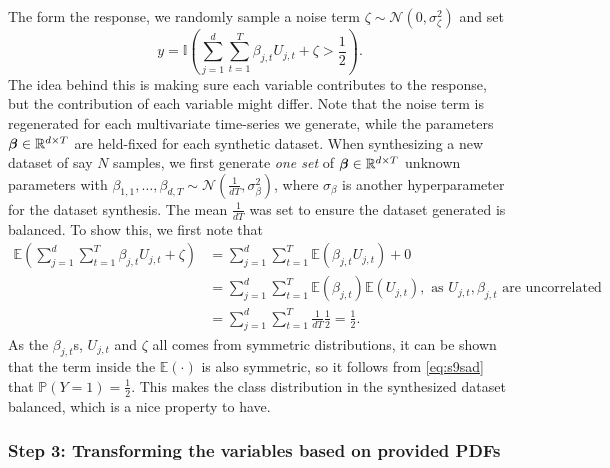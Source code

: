 \documentclass{statsmsc}
\begin{document}
{The form the response, we randomly sample a noise term $\zeta \sim \mathcal{N}(0,\sigma_\zeta^2)$
and set
\begin{equation}
    y=\mathbb{I}\left(\sum^{d}_{j=1} \sum^{T}_{t=1} \beta_{j,t} U_{j,t}+\zeta > \frac{1}{2}  \right).
\end{equation}
The idea behind this is making sure each variable contributes to the response, but the contribution
of each variable might differ.
Note that the noise term is regenerated for each multivariate time-series we generate, while the
parameters $\bm\beta \in \mathbb{R}^{d \times T}$ are held-fixed for each synthetic dataset.
When synthesizing a new dataset of say $N$ samples, we first generate \textit{one set} of
$\bm\beta \in \mathbb{R}^{d \times T}$ unknown parameters with
$\beta_{1,1},\dots,\beta_{d,T} \sim \mathcal{N}\left(\frac{1}{dT},\sigma_{\beta}^2\right)$, where
$\sigma_\beta$ is another hyperparameter for the dataset synthesis. The mean $\frac{1}{dT}$
was set to
ensure the dataset generated is balanced. To show this, we first note that
\begin{align}
    \mathbb{E}\left(
        \sum^{d}_{j=1} \sum^{T}_{t=1} \beta_{j,t} U_{j,t}+\zeta
    \right)
    &=\sum^{d}_{j=1} \sum^{T}_{t=1}  \mathbb{E}\left(\beta_{j,t} U_{j,t} \right)+0 \nonumber\\
    &=\sum^{d}_{j=1} \sum^{T}_{t=1}  \mathbb{E}\left(\beta_{j,t}\right)
    \mathbb{E}\left(U_{j,t} \right), \textrm{ as } U_{j,t}, \beta_{j,t}\textrm{ are uncorrelated}\nonumber \\
    &=\sum^{d}_{j=1} \sum^{T}_{t=1} \frac{1}{dT} \frac{1}{2} =\frac{1}{2} \label{eq:s9sad}.
\end{align}
As the $\beta_{j,t}$s, $U_{j,t}$ and $\zeta$ all comes from symmetric distributions, it can
be shown that the term inside the $\mathbb{E}(\cdot)$ is also symmetric, so it follows from
\cref{eq:s9sad} that $\mathbb{P}(Y=1)=\frac{1}{2}$. This makes the class distribution in the
synthesized dataset balanced, which is a nice property to have.

\subsubsection{Step 3: Transforming the variables based on provided PDFs}%
\label{ssub:Step 3: Estimating the inverse CDF}

}
\end{document}
